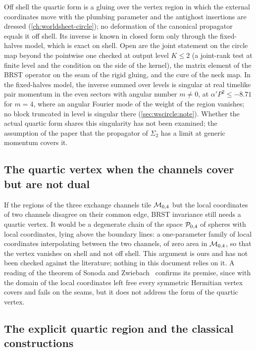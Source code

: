 Off shell the quartic form is a gluing over the vertex region in which the external coordinates move with the plumbing parameter and the antighost insertions are dressed (\cref{ch:worldsheet-circle}); no deformation of the canonical propagator equals it off shell.
Its inverse is known in closed form only through the fixed-halves model, which is exact on shell.
Open are the joint statement on the circle map beyond the pointwise one checked at output level $K \le 2$ (a joint-rank test at finite level and the condition on the side of the kernel), the matrix element of the BRST operator on the seam of the rigid gluing, and the cure of the neck map.
In the fixed-halves model, the inverse summed over levels is singular at real timelike pair momentum in the even sectors with angular number $m \neq 0$, at $\alpha' P^2 \le - 8.71$ for $m = 4$, where an angular Fourier mode of the weight of the region vanishes; no block truncated in level is singular there (\cref{sec:wscircle:note}).
Whether the actual quartic form shares this singularity has not been examined; the assumption of the paper that the propagator of $\Sigma_2$ has a limit at generic momentum covers it.

\subsection{The quartic vertex when the channels cover but are not dual}
\label{sec:open:not-dual}

If the regions of the three exchange channels tile ${\mathcal{M}}_{0, 4}$ but the local coordinates of two channels disagree on their common edge, BRST invariance still needs a quartic vertex.
It would be a degenerate chain of the space ${\mathcal{P}}_{0, 4}$ of spheres with local coordinates, lying above the boundary lines: a one-parameter family of local coordinates interpolating between the two channels, of zero area in ${\mathcal{M}}_{0, 4}$, so that the vertex vanishes on shell and not off shell.
This argument is ours and has not been checked against the literature; nothing in this document relies on it.
A reading of the theorem of Sonoda and Zwiebach~\cite{Sonoda:1990:CovariantClosedString} confirms its premise, since with the domain of the local coordinates left free every symmetric Hermitian vertex covers and fails on the seams, but it does not address the form of the quartic vertex.

\subsection{The explicit quartic region and the classical constructions}
\label{sec:open:classical-regions}


